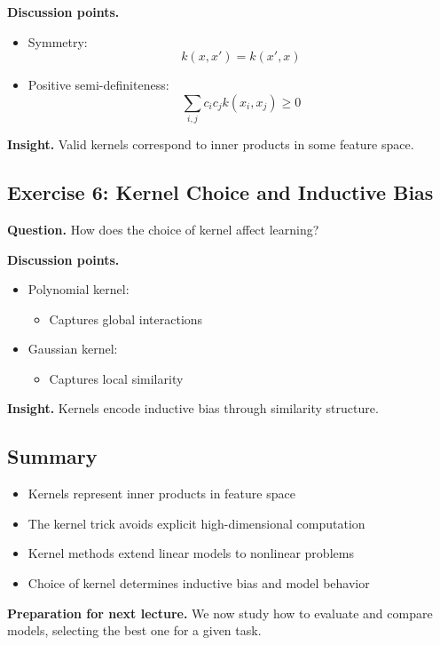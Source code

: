 \medskip

\noindent
\textbf{Discussion points.}

\begin{itemize}
    \item Symmetry:
    \[
    k(x,x') = k(x',x)
    \]
    \item Positive semi-definiteness:
    \[
    \sum_{i,j} c_i c_j k(x_i, x_j) \geq 0
    \]
\end{itemize}

\medskip

\noindent
\textbf{Insight.}  
Valid kernels correspond to inner products in some feature space.

\subsection{Exercise 6: Kernel Choice and Inductive Bias}

\textbf{Question.}  
How does the choice of kernel affect learning?

\medskip

\noindent
\textbf{Discussion points.}

\begin{itemize}
    \item Polynomial kernel:
    \begin{itemize}
        \item Captures global interactions
    \end{itemize}

    \item Gaussian kernel:
    \begin{itemize}
        \item Captures local similarity
    \end{itemize}
\end{itemize}

\medskip

\noindent
\textbf{Insight.}  
Kernels encode inductive bias through similarity structure.

\subsection{Summary}

\begin{itemize}
    \item Kernels represent inner products in feature space
    \item The kernel trick avoids explicit high-dimensional computation
    \item Kernel methods extend linear models to nonlinear problems
    \item Choice of kernel determines inductive bias and model behavior
\end{itemize}

\medskip

\noindent
\textbf{Preparation for next lecture.}  
We now study how to evaluate and compare models, selecting the best one for a given task.